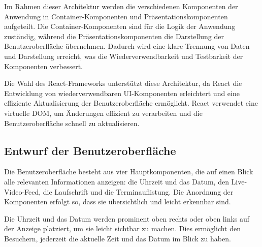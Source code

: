 Im Rahmen dieser Architektur werden die verschiedenen Komponenten der Anwendung in Container-Komponenten und Präsentationskomponenten aufgeteilt.
Die Container-Komponenten sind für die Logik der Anwendung zuständig, während die Präsentationskomponenten die Darstellung der Benutzeroberfläche übernehmen.
Dadurch wird eine klare Trennung von Daten und Darstellung erreicht, was die Wiederverwendbarkeit und Testbarkeit der Komponenten verbessert.


Die Wahl des React-Frameworks unterstützt diese Architektur, da React die Entwicklung von wiederverwendbaren \ac{UI}-Komponenten erleichtert und eine effiziente Aktualisierung der Benutzeroberfläche ermöglicht.
React verwendet eine virtuelle \ac{DOM}, um Änderungen effizient zu verarbeiten und die Benutzeroberfläche schnell zu aktualisieren.

%


\subsection{Entwurf der Benutzeroberfläche}
\label{sec:Benutzeroberflaeche} 
Die Benutzeroberfläche besteht aus vier Hauptkomponenten, die auf einen Blick alle relevanten Informationen anzeigen: die Uhrzeit und das Datum, den Live-Video-Feed, die Laufschrift und die Terminauflistung.
Die Anordnung der Komponenten erfolgt so, dass sie übersichtlich und leicht erkennbar sind.

Die Uhrzeit und das Datum werden prominent oben rechts oder oben links auf der Anzeige platziert, um sie leicht sichtbar zu machen.
Dies ermöglicht den Besuchern, jederzeit die aktuelle Zeit und das Datum im Blick zu haben.

